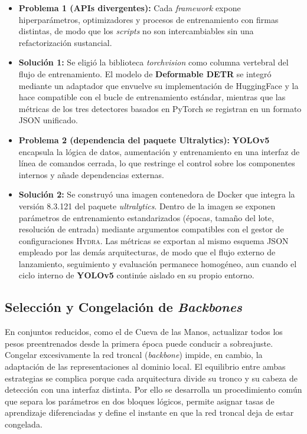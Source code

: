 \begin{itemize}
  \item \textbf{Problema 1 (APIs divergentes):}
        Cada \emph{framework} expone hiperparámetros, optimizadores y procesos de entrenamiento con firmas distintas, de modo que los \emph{scripts} no son intercambiables sin una refactorización sustancial.

  \item \textbf{Solución 1:}
        Se eligió la biblioteca \textit{torchvision} como columna vertebral del flujo de entrenamiento.
        El modelo de \textbf{Deformable DETR} se integró mediante un adaptador que envuelve su implementación de HuggingFace y la hace compatible con el bucle de entrenamiento estándar, mientras que las métricas de los tres detectores basados en PyTorch se registran en un formato JSON unificado.

  \item \textbf{Problema 2 (dependencia del paquete Ultralytics):}
        \textbf{YOLOv5} encapsula la lógica de datos, aumentación y entrenamiento en una interfaz de línea de comandos cerrada, lo que restringe el control sobre los componentes internos y añade dependencias externas.

  \item \textbf{Solución 2:}
        Se construyó una imagen contenedora de Docker que integra la versión 8.3.121 del paquete \textit{ultralytics}.
        Dentro de la imagen se exponen parámetros de entrenamiento estandarizados (épocas, tamaño del lote, resolución de entrada) mediante argumentos compatibles con el gestor de configuraciones \textsc{Hydra}.
        Las métricas se exportan al mismo esquema JSON empleado por las demás arquitecturas, de modo que el flujo externo de lanzamiento, seguimiento y evaluación permanece homogéneo, aun cuando el ciclo interno de \textbf{YOLOv5} continúe aislado en su propio entorno.
\end{itemize}

\subsection{Selección y Congelación de \emph{Backbones}}\label{ssec:freeze}

En conjuntos reducidos, como el de Cueva de las Manos, actualizar todos los pesos preentrenados desde la primera época puede conducir a sobreajuste.
Congelar excesivamente la red troncal (\emph{backbone}) impide, en cambio, la adaptación de las representaciones al dominio local.
El equilibrio entre ambas estrategias se complica porque cada arquitectura divide su tronco y su cabeza de detección con una interfaz distinta.
Por ello se desarrolla un procedimiento común que separa los parámetros en dos bloques lógicos, permite asignar tasas de aprendizaje diferenciadas y define el instante en que la red troncal deja de estar congelada.

